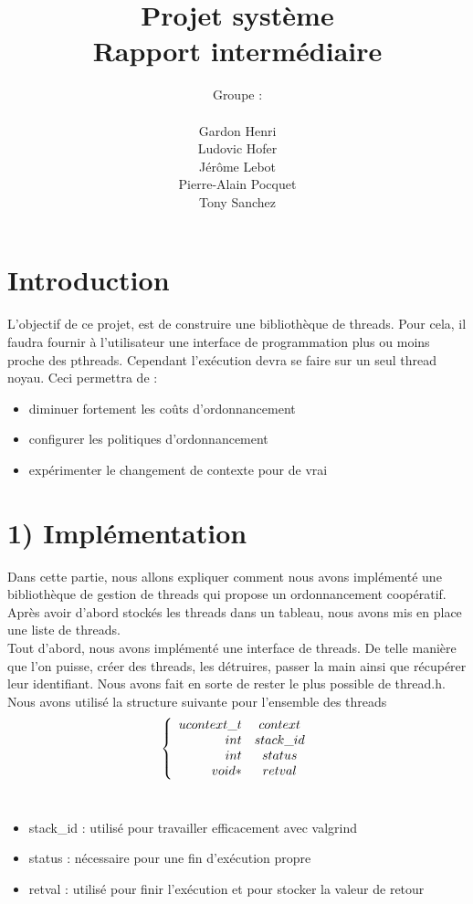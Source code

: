 \documentclass{report}
\author{Groupe :\\ \\Gardon Henri\\Ludovic Hofer\\Jérôme Lebot\\Pierre-Alain Pocquet\\Tony Sanchez}
\title{Projet système \\ Rapport intermédiaire}
\begin{document}
\maketitle

\section*{Introduction}
 
 L'objectif de ce projet, est de construire une bibliothèque de threads. Pour
cela, il faudra fournir à l'utilisateur une interface de programmation plus ou
moins proche des pthreads.
 Cependant l'exécution devra se faire sur un seul thread noyau.
 Ceci permettra de :
 \\
 \begin{itemize}
 \item diminuer fortement les coûts d'ordonnancement
 \item configurer les politiques d'ordonnancement
 \item expérimenter le changement de contexte pour de vrai
 \end{itemize}

\section*{1) Implémentation}
 
 	Dans cette partie, nous allons expliquer comment nous avons implémenté une
bibliothèque de gestion de threads qui propose un ordonnancement coopératif.
Après avoir d'abord stockés les threads dans un tableau, nous avons mis en place
une liste de threads.%
 \\
	Tout d'abord, nous avons implémenté une interface de threads. De telle manière
que l'on puisse, créer des threads, les détruires, passer la main ainsi que
récupérer leur identifiant. Nous avons fait en sorte de rester le plus possible
de thread.h. 
\\
Nous avons utilisé la structure suivante pour l'ensemble des threads
\\
\[
\left\{
\begin{array}{r c }
ucontext\_t &context\\
int &stack\_id\\
int & status\\
void* & retval
\end{array}
\right.
\]
\\
\begin{itemize}
\item stack\_id : utilisé pour travailler efficacement avec valgrind
\item status : nécessaire pour une fin d'exécution propre
\item retval : utilisé pour finir l'exécution et pour stocker la valeur de
  retour
\end{itemize}
\end{document}
